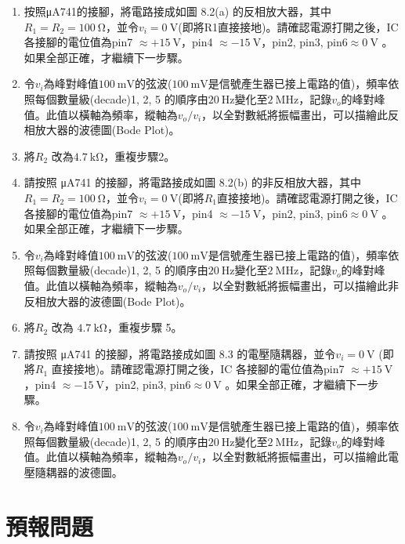 \documentclass[12pt, a4paper]{article}
\begin{document}
\begin{enumerate}[itemsep=0pt]
  \item 按照μA741的接腳，將電路接成如圖 8.2(a) 的反相放大器，其中$R_1 = R_2 = \SI{100}\ohm$，並令$v_i = \SI{0}\V$(即將R1直接接地)。請確認電源打開之後，IC 各接腳的電位值為pin7 $\approx +\SI{15}\V$，pin4 $\approx -\SI{15}\V$，pin2, pin3, pin6$\approx \SI{0}\V$ 。如果全部正確，才繼續下一步驟。
  \item 令$v_i$為峰對峰值$\SI{100}\mV$的弦波($\SI{100}\mV$是信號產生器已接上電路的值)，頻率依照每個數量級(decade)1, 2, 5 的順序由$\SI{20}\Hz$變化至$\SI{2}\MHz$，記錄$v_o$的峰對峰值。此值以橫軸為頻率，縱軸為$v_o / v_i$，以全對數紙將振幅畫出，可以描繪此反相放大器的波德圖(Bode Plot)。
  \item 將$R_2$ 改為$\SI{4.7}\kohm$，重複步驟2。
  \item 請按照 μA741 的接腳，將電路接成如圖 8.2(b) 的非反相放大器，其中$R_1 = R_2 = \SI{100}\ohm$，並令$v_i = \SI{0}\V$(即將$R_1$直接接地)。請確認電源打開之後，IC 各接腳的電位值為pin7 $\approx +\SI{15}\V$，pin4 $\approx -\SI{15}\V$，pin2, pin3, pin6$\approx \SI{0}\V$ 。如果全部正確，才繼續下一步驟。
  \item 令$v_i$為峰對峰值$\SI{100}\mV$的弦波($\SI{100}\mV$是信號產生器已接上電路的值)，頻率依照每個數量級(decade)1, 2, 5 的順序由$\SI{20}\Hz$變化至$\SI{2}\MHz$，記錄$v_o$的峰對峰值。此值以橫軸為頻率，縱軸為$v_o / v_i$，以全對數紙將振幅畫出，可以描繪此非反相放大器的波德圖(Bode Plot)。
  \item 將$R_2$ 改為 $\SI{4.7}\kohm$，重複步驟 5。
  \item 請按照 μA741 的接腳，將電路接成如圖 8.3 的電壓隨耦器，並令$v_i = \SI{0}\V$ (即將$R_1$ 直接接地)。請確認電源打開之後，IC 各接腳的電位值為pin7 $\approx +\SI{15}\V$，pin4 $\approx -\SI{15}\V$，pin2, pin3, pin6$\approx \SI{0}\V$ 。如果全部正確，才繼續下一步驟。
  \item 令$v_i$為峰對峰值$\SI{100}\mV$的弦波($\SI{100}\mV$是信號產生器已接上電路的值)，頻率依照每個數量級(decade)1, 2, 5 的順序由$\SI{20}\Hz$變化至$\SI{2}\MHz$，記錄$v_o$的峰對峰值。此值以橫軸為頻率，縱軸為$v_o / v_i$，以全對數紙將振幅畫出，可以描繪此電壓隨耦器的波德圖。
\end{enumerate}


\section{預報問題}
\end{document}
